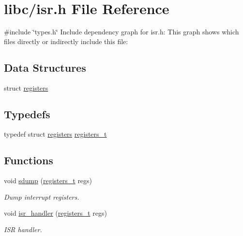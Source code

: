 \hypertarget{a00095}{}\section{libc/isr.h File Reference}
\label{a00095}
{\ttfamily \#include \char`\"{}types.\+h\char`\"{}}\newline
Include dependency graph for isr.\+h\+:
This graph shows which files directly or indirectly include this file\+:
\subsection*{Data Structures}
\begin{DoxyCompactItemize}
\item 
struct \hyperlink{a00202}{registers}
\end{DoxyCompactItemize}
\subsection*{Typedefs}
\begin{DoxyCompactItemize}
\item 
typedef struct \hyperlink{a00202}{registers} \hyperlink{a00095_adf58dbaf6139b4957c348711f2026957_adf58dbaf6139b4957c348711f2026957}{registers\+\_\+t}
\end{DoxyCompactItemize}
\subsection*{Functions}
\begin{DoxyCompactItemize}
\item 
void \hyperlink{a00095_a4b4233daef6e041e7278cae2b21b5ed4_a4b4233daef6e041e7278cae2b21b5ed4}{sdump} (\hyperlink{a00095_adf58dbaf6139b4957c348711f2026957_adf58dbaf6139b4957c348711f2026957}{registers\+\_\+t} regs)
\begin{DoxyCompactList}\small\item\em Dump interrupt registers. \end{DoxyCompactList}\item 
void \hyperlink{a00095_a700e3ca056bf69296370f504f2cb6cc8_a700e3ca056bf69296370f504f2cb6cc8}{isr\+\_\+handler} (\hyperlink{a00095_adf58dbaf6139b4957c348711f2026957_adf58dbaf6139b4957c348711f2026957}{registers\+\_\+t} regs)
\begin{DoxyCompactList}\small\item\em I\+SR handler. \end{DoxyCompactList}\end{DoxyCompactItemize}


